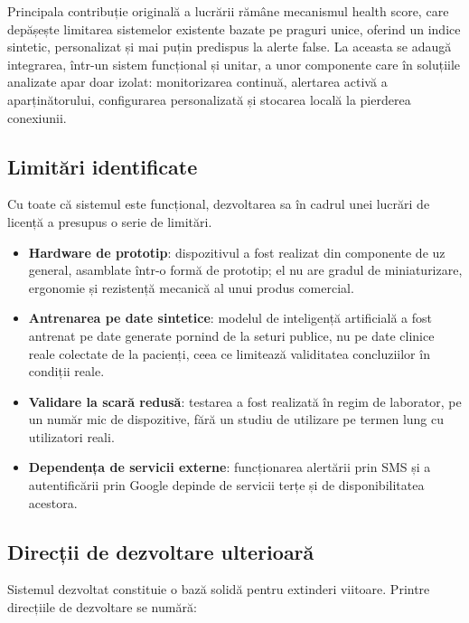 \documentclass[12pt,a4paper,twoside]{article}
\begin{document}
Principala contribuție originală a lucrării rămâne mecanismul health score, care depășește limitarea sistemelor existente bazate pe praguri unice, oferind un indice sintetic, personalizat și mai puțin predispus la alerte false. La aceasta se adaugă integrarea, într-un sistem funcțional și unitar, a unor componente care în soluțiile analizate apar doar izolat: monitorizarea continuă, alertarea activă a aparținătorului, configurarea personalizată și stocarea locală la pierderea conexiunii.

\subsection{Limitări identificate}

Cu toate că sistemul este funcțional, dezvoltarea sa în cadrul unei lucrări de licență a presupus o serie de limitări.

\begin{itemize}[leftmargin=1.5em]
\item \textbf{Hardware de prototip}: dispozitivul a fost realizat din componente de uz general, asamblate într-o formă de prototip; el nu are gradul de miniaturizare, ergonomie și rezistență mecanică al unui produs comercial.
\item \textbf{Antrenarea pe date sintetice}: modelul de inteligență artificială a fost antrenat pe date generate pornind de la seturi publice, nu pe date clinice reale colectate de la pacienți, ceea ce limitează validitatea concluziilor în condiții reale.
\item \textbf{Validare la scară redusă}: testarea a fost realizată în regim de laborator, pe un număr mic de dispozitive, fără un studiu de utilizare pe termen lung cu utilizatori reali.
\item \textbf{Dependența de servicii externe}: funcționarea alertării prin SMS și a autentificării prin Google depinde de servicii terțe și de disponibilitatea acestora.
\end{itemize}

\subsection{Direcții de dezvoltare ulterioară}

Sistemul dezvoltat constituie o bază solidă pentru extinderi viitoare. Printre direcțiile de dezvoltare se numără:
\end{document}
